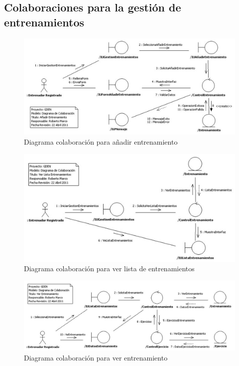 		
		\subsection{Colaboraciones para la gestión de entrenamientos} %
			\label{sub:colaboraciones_para_la_gestion_de_entrenamientos}
		
			\begin{figure}[H]
			  \centering
			    \includegraphics[width=16cm]{./eps/colaboraciones/gestion_entrenamiento/AnadirEntrenamiento.eps}
			  \caption{Diagrama colaboración para añadir entrenamiento}
			  \label{fig:col_anadir_entrenamiento}
			\end{figure}
			
			\begin{figure}[H]
			  \centering
			    \includegraphics[width=16cm]{./eps/colaboraciones/gestion_entrenamiento/VerListaEntrenamientos.eps}
			  \caption{Diagrama colaboración para ver lista de entrenamientos}
			  \label{fig:col_ver_lista_entrenamientos}
			\end{figure}
			
			\begin{figure}[H]
			  \centering
			    \includegraphics[width=16cm]{./eps/colaboraciones/gestion_entrenamiento/VerEntrenamiento.eps}
			  \caption{Diagrama colaboración para ver entrenamiento}
			  \label{fig:col_ver_entrenamiento}
			\end{figure}
			
